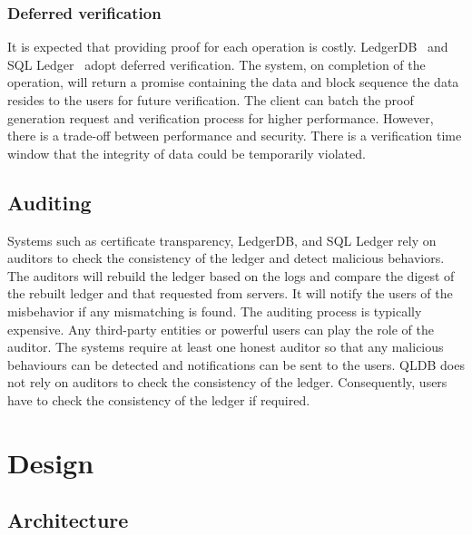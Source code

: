 \documentclass[11pt,dvipdfm]{article}
\begin{document}
\subsubsection{Deferred verification}
It is expected that providing
proof for each operation is costly. 
LedgerDB~\cite{ledgerdb} and SQL Ledger~\cite{sqlledger} adopt deferred verification. The system, on completion of the operation, will return a promise containing the data and block sequence the data resides to the users for future verification. The client can batch the proof generation request and verification process for higher performance. 
However, there is a trade-off between performance and security. There is a verification time window that the integrity of data could be temporarily violated.

\subsection{Auditing}
Systems such as certificate transparency, LedgerDB, and SQL Ledger rely on auditors to check the consistency of the ledger and detect malicious behaviors. The auditors will rebuild the ledger based on the logs and compare the digest of the rebuilt ledger and that requested from servers.
It will notify the users of the misbehavior if any mismatching is found. The auditing process is typically expensive. 
Any third-party entities or powerful users can play the role of the auditor. 
The systems require at least one honest auditor so that any malicious behaviours can be detected and notifications can be sent to the users. QLDB does not rely on auditors to check the consistency of the ledger. Consequently, users have to check the consistency of the ledger if required.


\section{Design}
\label{sec:design}

\subsection{Architecture}
\label{sec:overview}
\end{document}

